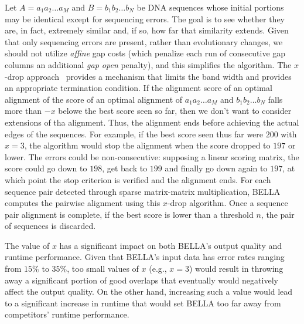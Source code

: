 Let $A = a_1a_2 \dots a_M$ and $B = b_1b_2 \dots b_N$ be DNA sequences whose initial portions may be identical except for sequencing errors.
The goal is to see whether they are, in fact, extremely similar and, if so, how far that similarity extends.
Given that only sequencing errors are present, rather than evolutionary changes, we should not utilize \textit{affine} gap costs (which penalize each run of consecutive gap columns an additional \textit{gap open} penalty), and this simplifies the algorithm.
The $x$-drop approach~\citep{zhang2000greedy} provides a mechanism that limits the band width and provides an appropriate termination condition.
If the alignment score of an optimal alignment of  the score of an optimal alignment of $a_1a_2 \dots a_M$ and $b_1b_2 \dots b_N$ falls more than $-x$ belowe the best score seen so far, then we don't want to consider extensions of tha alignment. Thus, the alignment ends before achieving the actual edges of the sequences. 
For example, if the best score seen thus far were $200$ with $x = 3$, the algorithm would stop the alignment when the score dropped to $197$ or lower.
The errors could be non-consecutive: supposing a linear scoring matrix, the score could go down to $198$, get back to $199$ and finally go down again to $197$, at which point the stop criterion is verified and the alignment ends.
For each sequence pair detected through sparse matrix-matrix multiplication, BELLA computes the pairwise alignment using this $x$-drop algorithm. 
Once a sequence pair alignment is complete, if the best score is lower than a threshold $n$, the pair of sequences is discarded.

The value of $x$ has a significant impact on both BELLA's output quality and runtime performance.
Given that BELLA's input data has error rates ranging from $15\%$ to $35\%$, too small values of $x$ (e.g., $x = 3$) would result in throwing away a significant portion of good overlaps that eventually would negatively affect the output quality.
On the other hand, increasing such a value would lead to a significant increase in runtime that would set BELLA too far away from competitors' runtime performance.
